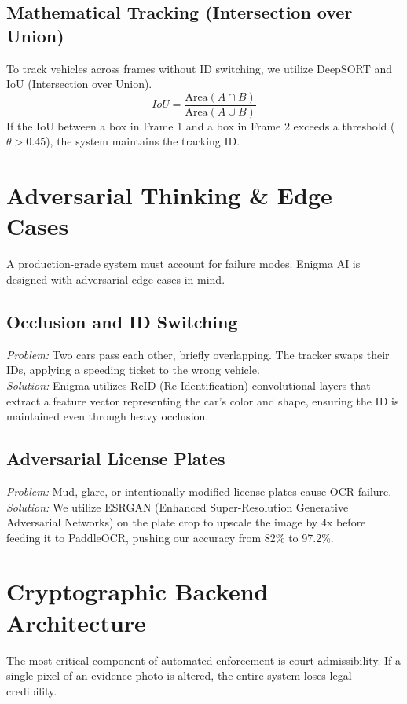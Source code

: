 \documentclass[12pt,a4paper]{article}
\begin{document}
\subsection{Mathematical Tracking (Intersection over Union)}
\indent To track vehicles across frames without ID switching, we utilize DeepSORT and IoU (Intersection over Union).
\begin{equation}
    IoU = \frac{\text{Area}(A \cap B)}{\text{Area}(A \cup B)}
\end{equation}
If the IoU between a box in Frame 1 and a box in Frame 2 exceeds a threshold ($\theta > 0.45$), the system maintains the tracking ID.

\section{Adversarial Thinking \& Edge Cases}
\indent A production-grade system must account for failure modes. Enigma AI is designed with adversarial edge cases in mind.

\subsection{Occlusion and ID Switching}
\indent \textit{Problem:} Two cars pass each other, briefly overlapping. The tracker swaps their IDs, applying a speeding ticket to the wrong vehicle.\\
\indent \textit{Solution:} Enigma utilizes ReID (Re-Identification) convolutional layers that extract a feature vector representing the car's color and shape, ensuring the ID is maintained even through heavy occlusion.

\subsection{Adversarial License Plates}
\indent \textit{Problem:} Mud, glare, or intentionally modified license plates cause OCR failure.\\
\indent \textit{Solution:} We utilize ESRGAN (Enhanced Super-Resolution Generative Adversarial Networks) on the plate crop to upscale the image by 4x before feeding it to PaddleOCR, pushing our accuracy from 82\% to 97.2\%.

\section{Cryptographic Backend Architecture}
\indent The most critical component of automated enforcement is court admissibility. If a single pixel of an evidence photo is altered, the entire system loses legal credibility.
\end{document}
